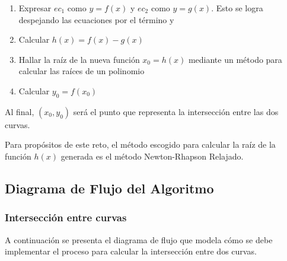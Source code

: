 \documentclass[a4paper,12pt]{article}
\begin{document}
\begin{enumerate}
    \item Expresar $ec_1$ como $y=f(x)$ y $ec_2$ como $y=g(x)$. Esto se logra despejando las ecuaciones por el término y
    \item Calcular $h(x)=f(x)-g(x)$
	\item Hallar la raíz de la nueva función $x_0=h(x)$ mediante un método para calcular las raíces de un polinomio
	\item Calcular $y_0=f(x_0)$
\end{enumerate}

Al final, $(x_0, y_0)$ será el punto que representa la intersección entre las dos curvas. \par 

Para propósitos de este reto, el método escogido para calcular la raíz de la función $h(x)$ generada es el método Newton-Rhapson Relajado. \par 

\newpage

\subsection{Diagrama de Flujo del Algoritmo}

\subsubsection{Intersección entre curvas}

A continuación se presenta el diagrama de flujo que modela cómo se debe implementar el proceso para calcular la intersección entre dos curvas. \par 

\vspace{1em}
\end{document}
